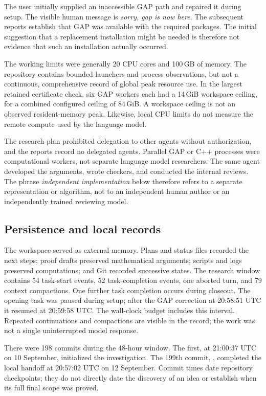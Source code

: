 The user initially supplied an inaccessible GAP path and repaired it
during setup. The visible human message is \emph{sorry, gap is now here}.
The subsequent reports establish that GAP was available with the
required packages. The initial suggestion that a replacement
installation might be needed is therefore not evidence that such an
installation actually occurred.

The working limits were generally 20 CPU cores and 100\,GB of memory.
The repository contains bounded launchers and process observations,
but not a continuous, comprehensive record of global peak resource
use. In the largest retained certificate check, six GAP workers each
had a 14\,GiB workspace ceiling, for a combined configured ceiling of
84\,GiB. A workspace ceiling is not an observed resident-memory peak.
Likewise, local CPU limits do not measure the remote compute used by
the language model.

The research plan prohibited delegation to other agents without
authorization, and the reports record no delegated agents. Parallel
GAP or C++ processes were computational workers, not separate language
model researchers. The same agent developed the arguments, wrote
checkers, and conducted the internal reviews. The phrase
\emph{independent implementation} below therefore refers to a separate
representation or algorithm, not to an independent human author or
an independently trained reviewing model.

\subsection{Persistence and local records}

The workspace served as external memory. Plans and status files recorded
the next steps; proof drafts preserved mathematical arguments; scripts
and logs preserved computations; and Git recorded successive states.
The research window contains 54 task-start events, 52 task-completion
events, one aborted turn, and 79 context compactions. One further task
completion occurs during closeout. The opening task was paused during
setup; after the GAP correction at 20:58:51 UTC it resumed at
20:59:58 UTC. The wall-clock budget includes this interval. Repeated
continuations and compactions are visible in the record; the work was
not a single uninterrupted model response.

There were 198 commits during the 48-hour window. The first, at
21:00:37 UTC on 10 September, initialized the investigation.
The 199th commit, \snapshot{}, completed the local handoff at
20:57:02 UTC on 12 September. Commit times date repository checkpoints;
they do not directly date the discovery of an idea or establish when
its full final scope was proved.


